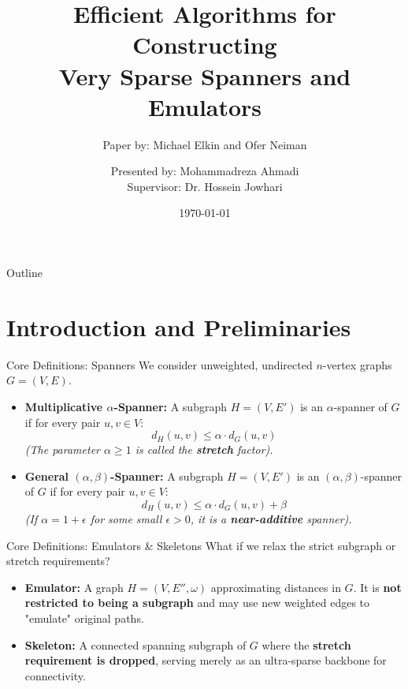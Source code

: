 \documentclass{beamer}
\title[Sparse Spanners \& Emulators]{Efficient Algorithms for Constructing \\ Very Sparse Spanners and Emulators}
\subtitle{Paper by: Michael Elkin and Ofer Neiman}
\author[M. Ahmadi]{Presented by: Mohammadreza Ahmadi \\ \vspace{0.3cm} Supervisor: Dr. Hossein Jowhari}
\institute[KNTU]{Faculty of Mathematics \\ K. N. Toosi University of Technology}
\date{\today}
\begin{document}
\begin{frame}
    \titlepage
\end{frame}

\begin{frame}{Outline}
    \tableofcontents
\end{frame}

\section{Introduction and Preliminaries}

\begin{frame}{Core Definitions: Spanners}
    We consider unweighted, undirected $n$-vertex graphs $G = (V,E)$.
    
    \vspace{0.4cm}
    \begin{itemize}
        \item \textbf{Multiplicative $\alpha$-Spanner:} A subgraph $H = (V, E')$ is an $\alpha$-spanner of $G$ if for every pair $u, v \in V$:
        \[ d_H(u,v) \le \alpha \cdot d_G(u,v) \]
        \textit{(The parameter $\alpha \ge 1$ is called the \textbf{stretch} factor).}
        
        \vspace{0.4cm}
        \item \textbf{General $(\alpha, \beta)$-Spanner:} A subgraph $H = (V, E')$ is an $(\alpha, \beta)$-spanner of $G$ if for every pair $u, v \in V$:
        \[ d_H(u,v) \le \alpha \cdot d_G(u,v) + \beta \]
        \textit{(If $\alpha = 1 + \epsilon$ for some small $\epsilon > 0$, it is a \textbf{near-additive} spanner).}
    \end{itemize}
\end{frame}

\begin{frame}{Core Definitions: Emulators \& Skeletons}
    What if we relax the strict subgraph or stretch requirements?
    
    \vspace{0.5cm}
    \begin{itemize}
        \item \textbf{Emulator:} A graph $H = (V, E'', \omega)$ approximating distances in $G$. It is \textbf{not restricted to being a subgraph} and may use new weighted edges to "emulate" original paths.
        
        \vspace{0.6cm}
        \item \textbf{Skeleton:} A connected spanning subgraph of $G$ where the \textbf{stretch requirement is dropped}, serving merely as an ultra-sparse backbone for connectivity.
    \end{itemize}
\end{frame}
\end{document}
